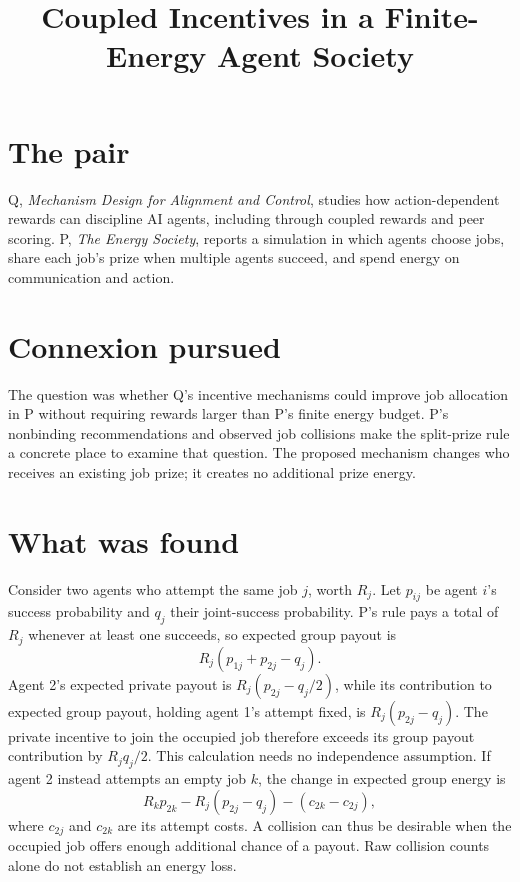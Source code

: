 \documentclass{article}
\title{Coupled Incentives in a Finite-Energy Agent Society}
\begin{document}
\maketitle

\section*{The pair}

Q, \emph{Mechanism Design for Alignment and Control}, studies how action-dependent rewards can discipline AI agents, including through coupled rewards and peer scoring. P, \emph{The Energy Society}, reports a simulation in which agents choose jobs, share each job's prize when multiple agents succeed, and spend energy on communication and action.

\section*{Connexion pursued}

The question was whether Q's incentive mechanisms could improve job allocation in P without requiring rewards larger than P's finite energy budget. P's nonbinding recommendations and observed job collisions make the split-prize rule a concrete place to examine that question. The proposed mechanism changes who receives an existing job prize; it creates no additional prize energy. 

\section*{What was found}

Consider two agents who attempt the same job \(j\), worth \(R_j\). Let \(p_{ij}\) be agent \(i\)'s success probability and \(q_j\) their joint-success probability. P's rule pays a total of \(R_j\) whenever at least one succeeds, so expected group payout is
\[
R_j(p_{1j}+p_{2j}-q_j).
\]
Agent 2's expected private payout is \(R_j(p_{2j}-q_j/2)\), while its contribution to expected group payout, holding agent 1's attempt fixed, is \(R_j(p_{2j}-q_j)\). The private incentive to join the occupied job therefore exceeds its group payout contribution by \(R_jq_j/2\). This calculation needs no independence assumption. If agent 2 instead attempts an empty job \(k\), the change in expected group energy is
\[
R_kp_{2k}-R_j(p_{2j}-q_j)-(c_{2k}-c_{2j}),
\]
where \(c_{2j}\) and \(c_{2k}\) are its attempt costs. A collision can thus be desirable when the occupied job offers enough additional chance of a payout. Raw collision counts alone do not establish an energy loss. 
\end{document}
